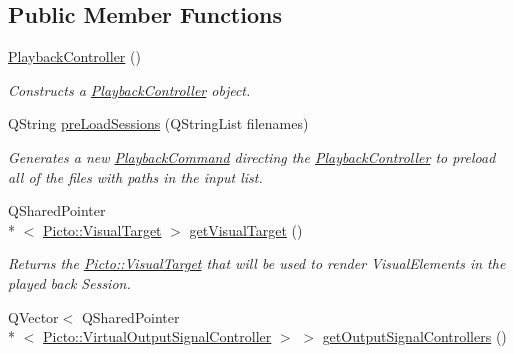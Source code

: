 \subsection*{Public Member Functions}
\begin{DoxyCompactItemize}
\item 
\hyperlink{class_playback_controller_aa686af90c24fd2d3060cef9ae9a1bfc9}{Playback\-Controller} ()
\begin{DoxyCompactList}\small\item\em Constructs a \hyperlink{class_playback_controller}{Playback\-Controller} object. \end{DoxyCompactList}\item 
Q\-String \hyperlink{class_playback_controller_aa7f76f6b48b02d77af10fdfadce8ca39}{pre\-Load\-Sessions} (Q\-String\-List filenames)
\begin{DoxyCompactList}\small\item\em Generates a new \hyperlink{struct_playback_command}{Playback\-Command} directing the \hyperlink{class_playback_controller}{Playback\-Controller} to preload all of the files with paths in the input list. \end{DoxyCompactList}\item 
\hypertarget{class_playback_controller_a18966c92ef418d521d22de3a5a1905a5}{Q\-Shared\-Pointer\\*
$<$ \hyperlink{class_picto_1_1_visual_target}{Picto\-::\-Visual\-Target} $>$ \hyperlink{class_playback_controller_a18966c92ef418d521d22de3a5a1905a5}{get\-Visual\-Target} ()}\label{class_playback_controller_a18966c92ef418d521d22de3a5a1905a5}

\begin{DoxyCompactList}\small\item\em Returns the \hyperlink{class_picto_1_1_visual_target}{Picto\-::\-Visual\-Target} that will be used to render Visual\-Elements in the played back Session. \end{DoxyCompactList}\item 
\hypertarget{class_playback_controller_af0d0cdbc217bbefd48886b62132025cf}{Q\-Vector$<$ Q\-Shared\-Pointer\\*
$<$ \hyperlink{class_picto_1_1_virtual_output_signal_controller}{Picto\-::\-Virtual\-Output\-Signal\-Controller} $>$ $>$ \hyperlink{class_playback_controller_af0d0cdbc217bbefd48886b62132025cf}{get\-Output\-Signal\-Controllers} ()}\label{class_playback_controller_af0d0cdbc217bbefd48886b62132025cf}


\end{DoxyCompactItemize}
